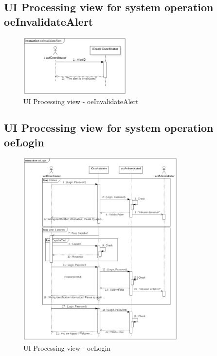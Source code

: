 \subsection{UI Processing view for system operation oeInvalidateAlert}

\begin{figure}[h]
	\centering	
	\captionsetup{justification=centering}
	\includegraphics[width=0.5\textwidth]{./images/ui_oeInvalidateAlert.eps}
	\caption{UI Processing view - oeInvalidateAlert}
\end{figure}


\subsection{UI Processing view for system operation oeLogin}

\begin{figure}[h]
	\centering	
	\captionsetup{justification=centering}
	\includegraphics[width=0.75\textwidth]{./images/ui_oeLogin.eps}
	\caption{UI Processing view - oeLogin}
\end{figure}



